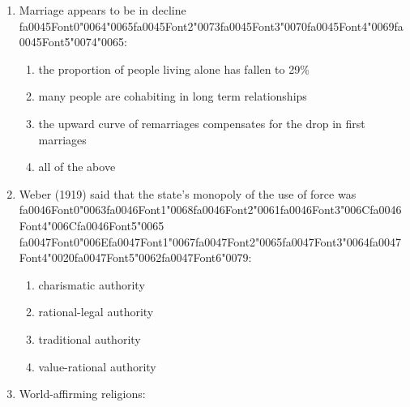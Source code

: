 \documentclass[12pt]{article}
\begin{document}
\begin{enumerate}[label=\arabic*.]
\begin{enumerate}[label=(\alph*)]
    \item there are no clearly defined projects into which the money can be directed
    \item the United Nations has refused to call on rich countries to provide it
    \item debt repayments with interest can be greater than the amount of money received
    \item debt repayments with interest can be greater than the amount of money received
\end{enumerate}
\item Marriage appears to be in decline {\csname fa0045Font0\endcsname\char"0064}{\char"0065}{\csname fa0045Font2\endcsname\char"0073}{\csname fa0045Font3\endcsname\char"0070}{\csname fa0045Font4\endcsname\char"0069}{\csname fa0045Font5\endcsname\char"0074}{\char"0065}:
\begin{enumerate}[label=(\alph*)]
    \item the proportion of people living alone has fallen to 29\%
    \item many people are cohabiting in long term relationships
    \item the upward curve of remarriages compensates for the drop in first marriages
    \item all of the above
\end{enumerate}
\item Weber (1919) said that the state's monopoly of the use of force was {\csname fa0046Font0\endcsname\char"0063}{\csname fa0046Font1\endcsname\char"0068}{\csname fa0046Font2\endcsname\char"0061}{\csname fa0046Font3\endcsname\char"006C}{\csname fa0046Font4\endcsname\char"006C}{\csname fa0046Font5\endcsname\char"0065} {\csname fa0047Font0\endcsname\char"006E}{\csname fa0047Font1\endcsname\char"0067}{\csname fa0047Font2\endcsname\char"0065}{\csname fa0047Font3\endcsname\char"0064}{\csname fa0047Font4\endcsname\char"0020}{\csname fa0047Font5\endcsname\char"0062}{\csname fa0047Font6\endcsname\char"0079}:
\begin{enumerate}[label=(\alph*)]
    \item charismatic authority
    \item rational-legal authority
    \item traditional authority
    \item value-rational authority
\end{enumerate}
\item World-affirming religions:

\end{enumerate}
\end{document}
